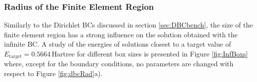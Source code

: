 \subsubsection{Radius of the Finite Element Region}
\label{ch:bmSize}
Similarly to the Dirichlet BCs discussed in section \ref{sec:DBCbench}, the size of the finite element region has a strong influence on the solution obtained with the infinite BC.
A study of the energies of solutions closest to a target value of $E_\text{target}=0.5664\,$Hartree for different box sizes is presented in Figure \ref{fig:InfBoxs} where, except for the boundary conditions, no parameters are changed with respect to Figure \ref{fig:dbcRad}a).

